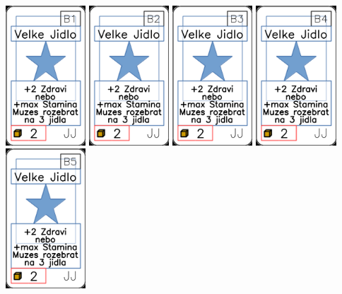 \documentclass[a4paper]{article}
\begin{document}
	\includegraphics[width=3.0cm]{img-1_35}
	\includegraphics[width=3.0cm]{img-1_36}
	\includegraphics[width=3.0cm]{img-1_37}
	\includegraphics[width=3.0cm]{img-1_38}
	\includegraphics[width=3.0cm]{img-1_39}
\end{document}
